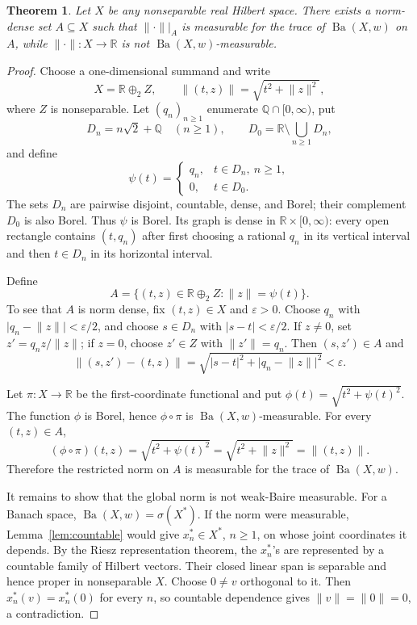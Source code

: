 \documentclass[11pt]{article}
\newtheorem{theorem}{Theorem}
\theoremstyle{remark}
\newcommand{\Ba}{\operatorname{Ba}}
\newcommand{\R}{\mathbb{R}}
\newcommand{\Q}{\mathbb{Q}}
\newcommand{\norm}[1]{\lVert #1\rVert}
\begin{document}
\begin{theorem}\label{thm:main}
Let \(X\) be any nonseparable real Hilbert space.  There exists a norm-dense
set \(A\subseteq X\) such that \(\norm{\cdot}|_A\) is measurable for the
trace of \(\Ba(X,w)\) on \(A\), while \(\norm{\cdot}:X\to\R\) is not
\(\Ba(X,w)\)-measurable.
\end{theorem}

\begin{proof}
Choose a one-dimensional summand and write
\[
 X=\R\oplus_2 Z,
 \qquad \norm{(t,z)}=\sqrt{t^2+\norm{z}^2},
\]
where \(Z\) is nonseparable.  Let \((q_n)_{n\ge1}\) enumerate
\(\Q\cap[0,\infty)\), put
\[
 D_n=n\sqrt2+\Q\quad(n\ge1),
 \qquad
 D_0=\R\setminus\bigcup_{n\ge1}D_n,
\]
and define
\[
 \psi(t)=
 \begin{cases}
 q_n,&t\in D_n,\ n\ge1,\\
 0,&t\in D_0.
 \end{cases}
\]
The sets \(D_n\) are pairwise disjoint, countable, dense, and Borel; their
complement \(D_0\) is also Borel.  Thus \(\psi\) is Borel.  Its graph is
dense in \(\R\times[0,\infty)\): every open rectangle contains
\((t,q_n)\) after first choosing a rational \(q_n\) in its vertical interval
and then \(t\in D_n\) in its horizontal interval.

Define
\[
 A=\{(t,z)\in\R\oplus_2 Z:\norm{z}=\psi(t)\}.
\]
To see that \(A\) is norm dense, fix \((t,z)\in X\) and
\(\varepsilon>0\).  Choose \(q_n\) with
\(\lvert q_n-\norm z\rvert<\varepsilon/2\), and choose
\(s\in D_n\) with \(\lvert s-t\rvert<\varepsilon/2\).  If \(z\ne0\), set
\(z'=q_nz/\norm z\); if \(z=0\), choose \(z'\in Z\) with
\(\norm{z'}=q_n\).  Then \((s,z')\in A\) and
\[
 \norm{(s,z')-(t,z)}
 =\sqrt{\lvert s-t\rvert^2+\lvert q_n-\norm z\rvert^2}<\varepsilon.
\]

Let \(\pi:X\to\R\) be the first-coordinate functional and put
\(\phi(t)=\sqrt{t^2+\psi(t)^2}\).  The function \(\phi\) is Borel, hence
\(\phi\circ\pi\) is \(\Ba(X,w)\)-measurable.  For every \((t,z)\in A\),
\[
 (\phi\circ\pi)(t,z)=\sqrt{t^2+\psi(t)^2}
 =\sqrt{t^2+\norm z^2}=\norm{(t,z)}.
\]
Therefore the restricted norm on \(A\) is measurable for the trace of
\(\Ba(X,w)\).

It remains to show that the global norm is not weak-Baire measurable.  For a
Banach space, \(\Ba(X,w)=\sigma(X^*)\).  If the norm were measurable,
Lemma~\ref{lem:countable} would give \(x_n^*\in X^*\), \(n\ge1\), on whose
joint coordinates it depends.  By the Riesz representation theorem, the
\(x_n^*\)'s are represented by a countable family of Hilbert vectors.  Their
closed linear span is separable and hence proper in nonseparable \(X\).
Choose \(0\ne v\) orthogonal to it.  Then \(x_n^*(v)=x_n^*(0)\) for every
\(n\), so countable dependence gives \(\norm v=\norm0=0\), a contradiction.
\end{proof}
\end{document}
